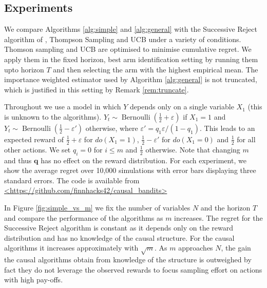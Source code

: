 \documentclass[11pt,a4paper,oneside]{book}
\newcommand{\bernoulli}{\operatorname{Bernoulli}}
\theoremstyle{plain}
\theoremstyle{definition}
\let\epsilon\varepsilon
\begin{document}
\subsection{Experiments}
We compare Algorithms \ref{alg:simple} and \ref{alg:general} with the Successive Reject algorithm of \cite{audibert2010best}, Thompson Sampling and UCB under a variety of conditions. Thomson sampling and UCB are optimised to minimise cumulative regret. We apply them in the fixed horizon, best arm identification setting by running them upto horizon $T$ and then selecting the arm with the highest empirical mean. The importance weighted estimator used by Algorithm \ref{alg:general} is not truncated, which is justified in this setting by Remark \ref{rem:truncate}. 

Throughout we use a model in which $Y$ depends only on a single variable $X_1$ (this is unknown to the algorithms). $Y_t \sim \bernoulli(\frac{1}{2}+\epsilon)$ if $X_1=1$ and $Y_t \sim \bernoulli(\frac{1}{2}-\epsilon')$ otherwise, where $\epsilon' = q_1\epsilon/(1-q_1)$. This leads to an expected reward of $\frac{1}{2}+\epsilon$ for $do(X_1=1)$, $\frac{1}{2}-\epsilon'$ for $do(X_1=0)$ and $\frac{1}{2}$ for all other actions. We set $q_i = 0$ for $i \leq m$ and $\frac{1}{2}$ otherwise. Note that changing $m$ and thus $\boldsymbol{q}$ has no effect on the reward distribution. For each experiment, we show the average regret over 10,000 simulations with error bars displaying three standard errors. The code is available from \url{<https://github.com/finnhacks42/causal_bandits>} 

In Figure \ref{fig:simple_vs_m} we fix the number of variables $N$ and the horizon $T$ and compare the performance of the algorithms as $m$ increases. The regret for the Successive Reject algorithm is constant as it depends only on the reward distribution and has no knowledge of the causal structure. For the causal algorithms it increases approximately with $\sqrt{m}$. As $m$ approaches $N$, the gain the causal algorithms obtain from knowledge of the structure is outweighed by fact they do not leverage the observed rewards to focus sampling effort on actions with high pay-offs.
\end{document}
